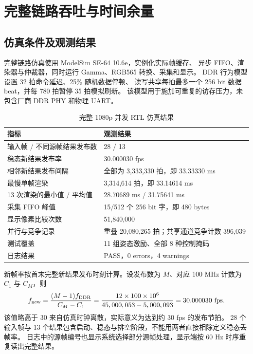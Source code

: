 \section{完整链路吞吐与时间余量}
\subsection{仿真条件及观测结果}
完整链路仿真使用 ModelSim SE-64 10.6e，实例化实际帧缓存、
异步 FIFO、渲染器与仲裁器，同时运行 Gamma、RGB565 转换、采集和显示。
DDR 行为模型设置 32 拍命令延迟、25\% 随机数据停顿、
读写共享每拍最多一个 256 bit 数据 beat，并每 780 拍暂停 35 拍模拟刷新。
该模型用于施加可重复的访存压力，未包含厂商 DDR PHY 和物理 UART。

\begin{table}[htbp]
\centering\small
\caption{完整 1080p 并发 RTL 仿真结果}\label{tab:simulation}
\begin{tabularx}{\textwidth}{p{5.6cm}Y}
\toprule
指标 & 观测结果 \\
\midrule
输入帧 / 不同源帧结果发布数 & 28 / 13 \\
稳态新结果发布率 & 30.000030 fps \\
相邻新结果发布间隔 & 全部为 3,333,330 拍，即 33.33330 ms \\
最慢单帧渲染 & 3,314,614 拍，即 33.14614 ms \\
13 次渲染的最小值 / 平均值 & 28.70689 ms / 31.75641 ms \\
采集 FIFO 峰值 & 15/512 个 256 bit 字，即 480 bytes \\
显示像素比较次数 & 51,840,000 \\
并行与竞争记录 & 重叠 20,080,265 拍；共享通道竞争计数 396,039 \\
测试覆盖 & 11 组姿态激励、全部 8 种控制掩码 \\
日志结果 & PASS，0 errors，4 warnings \\
\bottomrule
\end{tabularx}
\end{table}

新帧率按首末完整新结果发布时刻计算。设发布数为 $M$、对应 100 MHz 计数为
$C_1$ 与 $C_M$，则
\begin{equation}
f_{\rm new}=\frac{(M-1)f_{\rm DDR}}{C_M-C_1}
=\frac{12\times100\times10^6}{45,000,053-5,000,093}
=30.000030\ \text{fps}.
\end{equation}
该值略高于 30 来自仿真时钟离散，实际意义为达到约 30 fps 的发布节拍。
28 个输入帧与 13 个结果包含启动、稳态与排空阶段，不能用两者直接相除定义稳态丢帧率。
日志中的源帧编号也显示系统选择部分源帧处理，显示端按 60 Hz 时序重复读出完整结果。

